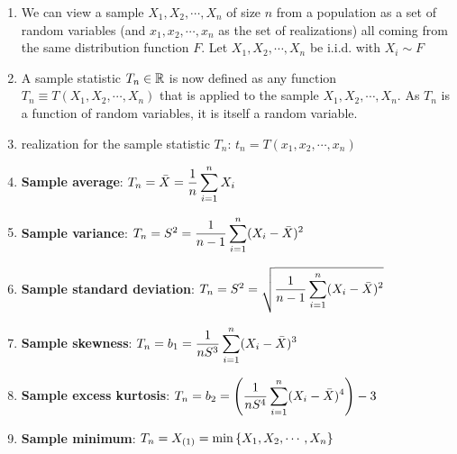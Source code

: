 \begin{enumerate}
    \item We can view a sample $X_1 , X_2 , \cdots, X _n$ of size $n$ from a population as a set of random variables (and $x_1 , x_2, \cdots , x _n$ as the set of realizations) all coming from the same distribution function $F$.
    Let $X_1 , X_2, \cdots , X _n$ be i.i.d. with $X _i \sim F$
    \hfill \cite{statistics/book/Statistics-for-Data-Scientists/Maurits-Kaptein}

    \item A sample statistic $T_n \in \mathbb{R}$ is now defined as any function $T_n \equiv T (X_1, X_2, \cdots , X _n )$ that is applied to the sample $X_1 , X_2, \cdots , X _n$.
    As $T_n$ is a function of random variables, it is itself a random variable.
    \hfill \cite{statistics/book/Statistics-for-Data-Scientists/Maurits-Kaptein}

    \item realization for the sample statistic $T_n$: $t _n = T (x_1, x_2, \cdots , x _n )$
    \hfill \cite{statistics/book/Statistics-for-Data-Scientists/Maurits-Kaptein}

    \item \textbf{Sample average}: $T_n = \bar{X} = \dfrac{1}{n}\displaystyle\sum^n _{i=1} X _i$
    \hfill \cite{statistics/book/Statistics-for-Data-Scientists/Maurits-Kaptein}

    \item \textbf{Sample variance}: $T_n = S^2 = \dfrac{1}{n - 1} \displaystyle\sum^n _{i=1}(X _i - \bar{X})^2$
    \hfill \cite{statistics/book/Statistics-for-Data-Scientists/Maurits-Kaptein}

    \item \textbf{Sample standard deviation}: $T_n = S^2 = \sqrt{\dfrac{1}{n - 1} \displaystyle\sum^n _{i=1}(X _i - \bar{X})^2}$
    \hfill \cite{statistics/book/Statistics-for-Data-Scientists/Maurits-Kaptein}

    \item \textbf{Sample skewness}: $T_n = b_1 = \dfrac{1}{n S^3} \displaystyle\sum^n _{i=1} (X _i - \bar{X})^3$
    \hfill \cite{statistics/book/Statistics-for-Data-Scientists/Maurits-Kaptein}

    \item \textbf{Sample excess kurtosis}: $T_n = b_2 = \left(\dfrac{1}{n S^4} \displaystyle\sum^n _{i=1} (X _i - \bar{X})^4\right) - 3$
    \hfill \cite{statistics/book/Statistics-for-Data-Scientists/Maurits-Kaptein}

    \item \textbf{Sample minimum}: $T_n = X_{(1)} = \min \left\{X_1, X_2, \cdots, X _n \right\}$
    \hfill \cite{statistics/book/Statistics-for-Data-Scientists/Maurits-Kaptein}


\end{enumerate}
